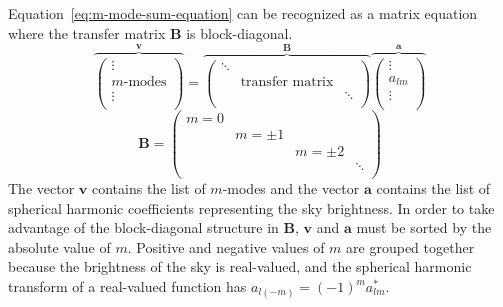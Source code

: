\documentclass[twocolumn]{aastex61}
\renewcommand{\b}{\pmb}
\begin{document}
Equation~\ref{eq:m-mode-sum-equation} can be recognized as a matrix equation where the transfer
matrix $\b B$ is block-diagonal.
\begin{equation}\label{eq:m-mode-matrix-equation}
    \overbrace{\left(
        \begin{array}{c}
            \vdots \\
            m\text{-modes} \\
            \vdots \\
        \end{array}
    \right)}^{\b v}
    =
    \overbrace{\left(
        \begin{array}{ccc}
            \ddots & & \\
            & \text{transfer matrix} & \\
            & & \ddots \\
        \end{array}
    \right)}^{\b B}
    \overbrace{\left(
        \begin{array}{c}
            \vdots \\
            a_{lm} \\
            \vdots \\
        \end{array}
    \right)}^{\b a}
\end{equation}
\begin{equation}
    \b B = \left(\begin{array}{cccc}
        m = 0 &&& \\
              & m=\pm1 && \\
              && m=\pm2 & \\
              &&& \ddots \\
    \end{array}\right)
\end{equation}
The vector $\b v$ contains the list of $m$-modes and the vector $\b a$ contains the list of
spherical harmonic coefficients representing the sky brightness. In order to take advantage of the
block-diagonal structure in $\b B$, $\b v$ and $\b a$ must be sorted by the absolute value of $m$.
Positive and negative values of $m$ are grouped together because the brightness of the sky is
real-valued, and the spherical harmonic transform of a real-valued function has $a_{l(-m)} = (-1)^m
a_{lm}^*$.
\end{document}
